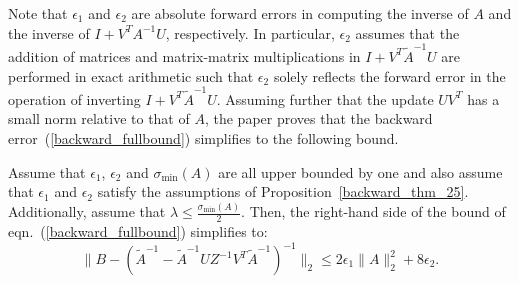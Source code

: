 \documentclass{siamltex}
\newcommand{\eqnref}[1]{(\ref{#1})}
\begin{document}
Note that $\epsilon_1$ and $\epsilon_2$ are absolute forward errors in computing the inverse of $A$ and the inverse of $I + V^T A^{-1} U$, respectively. In particular, $\epsilon_2$ assumes that the addition of matrices and matrix-matrix multiplications in $I + V^T \tilde{A}^{-1} U$ are performed in exact arithmetic such that $\epsilon_2$ solely reflects the forward error in the operation of inverting $I + V^T \tilde{A}^{-1} U$. Assuming further that the update $UV^T$ has a small norm relative to that of $A$, the paper \cite{Ma25} proves that the backward error~\eqnref{backward_fullbound} simplifies to the following bound.
\begin{proposition} \label{backward_corr_25}
\normalfont \cite[Cor. 7]{Ma25}  
Assume that $\epsilon_1$, $\epsilon_2$  and $\sigma_{\min}(A)$ are all upper bounded by one and also assume that $\epsilon_1$ and $\epsilon_2$ satisfy the assumptions of Proposition~\ref{backward_thm_25}. Additionally, assume that $\lambda \leq \frac{\sigma_{\min}(A)}{2}$. Then, the right-hand side of the bound of eqn.~(\ref{backward_fullbound}) simplifies to:
%
\begin{equation*}
\| B -\left(\widetilde{A}^{-1} - \widetilde{A}^{-1} U Z^{-1} V^T \widetilde{A}^{-1}\right)^{-1}\|_2 \leq 2 \epsilon_1 \|A\|_2^2 + 8\epsilon_2.
\end{equation*}   
\end{proposition}
\end{document}
